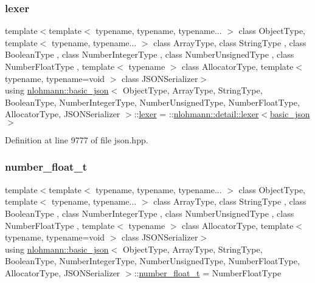 \subsubsection{\texorpdfstring{lexer}{lexer}}
{\footnotesize\ttfamily template$<$template$<$ typename, typename, typename... $>$ class Object\+Type, template$<$ typename, typename... $>$ class Array\+Type, class String\+Type , class Boolean\+Type , class Number\+Integer\+Type , class Number\+Unsigned\+Type , class Number\+Float\+Type , template$<$ typename $>$ class Allocator\+Type, template$<$ typename, typename=void $>$ class J\+S\+O\+N\+Serializer$>$ \\
using \hyperlink{classnlohmann_1_1basic__json}{nlohmann\+::basic\+\_\+json}$<$ Object\+Type, Array\+Type, String\+Type, Boolean\+Type, Number\+Integer\+Type, Number\+Unsigned\+Type, Number\+Float\+Type, Allocator\+Type, J\+S\+O\+N\+Serializer $>$\+::\hyperlink{classnlohmann_1_1basic__json_a163540181fa07868de2902ecdb6df2ae}{lexer} =  \+::\hyperlink{classnlohmann_1_1detail_1_1lexer}{nlohmann\+::detail\+::lexer}$<$\hyperlink{classnlohmann_1_1basic__json}{basic\+\_\+json}$>$\hspace{0.3cm}{\ttfamily [private]}}



Definition at line 9777 of file json.\+hpp.

\mbox{\label{classnlohmann_1_1basic__json_a88d6103cb3620410b35200ee8e313d97}} 
\subsubsection{\texorpdfstring{number\+\_\+float\+\_\+t}{number\_float\_t}}
{\footnotesize\ttfamily template$<$template$<$ typename, typename, typename... $>$ class Object\+Type, template$<$ typename, typename... $>$ class Array\+Type, class String\+Type , class Boolean\+Type , class Number\+Integer\+Type , class Number\+Unsigned\+Type , class Number\+Float\+Type , template$<$ typename $>$ class Allocator\+Type, template$<$ typename, typename=void $>$ class J\+S\+O\+N\+Serializer$>$ \\
using \hyperlink{classnlohmann_1_1basic__json}{nlohmann\+::basic\+\_\+json}$<$ Object\+Type, Array\+Type, String\+Type, Boolean\+Type, Number\+Integer\+Type, Number\+Unsigned\+Type, Number\+Float\+Type, Allocator\+Type, J\+S\+O\+N\+Serializer $>$\+::\hyperlink{classnlohmann_1_1basic__json_a88d6103cb3620410b35200ee8e313d97}{number\+\_\+float\+\_\+t} =  Number\+Float\+Type}



